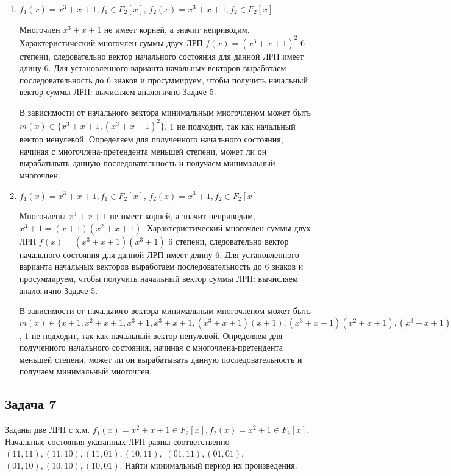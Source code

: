 \documentclass[12pt]{extarticle}
\begin{document}
\begin{enumerate}
     \item $f_1(x) = x^3+x+1, f_1\in F_2[x]$, $f_2(x) = x^3+x+1, f_2\in F_2[x]$
    
     Многочлен $x^3+x+1$ не имеет корней, а значит неприводим. Характеристический многочлен суммы двух ЛРП $f(x) = (x^3+x+1)^2$ 6 степени, следовательно вектор начального состояния для данной ЛРП имеет длину 6. Для установленного варианта начальных векторов выработаем последовательность до 6 знаков и просуммируем, чтобы получить начальный вектор суммы ЛРП: вычисляем аналогично Задаче 5.
     
     В зависимости от начального вектора минимальным многочленом может быть $m(x)\in\{x^3+x+1, (x^3+x+1)^2\}$, 1 не подходит, так как начальный вектор ненулевой. Определяем для полученного начального состояния, начиная с многочлена-претендента меньшей степени, может ли он вырабатывать данную последовательность и получаем минимальный многочлен.
     
     \item $f_1(x) = x^3+x+1, f_1\in F_2[x]$, $f_2(x) = x^3+1, f_2\in F_2[x]$
    
     Многочлены $x^3+x+1$  не имеет корней, а значит неприводим, $x^3+1 = (x+1)(x^2+x+1)$. Характеристический многочлен суммы двух ЛРП $f(x) = (x^3+x+1)(x^3+1)$ 6 степени, следовательно вектор начального состояния для данной ЛРП имеет длину 6. Для установленного варианта начальных векторов выработаем последовательность до 6 знаков и просуммируем, чтобы получить начальный вектор суммы ЛРП: вычисляем аналогично Задаче 5.
     
     В зависимости от начального вектора минимальным многочленом может быть $m(x)\in\{x+1, x^2+x+1, x^3+1, x^3+x+1, (x^3+x+1)(x+1), (x^3+x+1)(x^2+x+1), (x^3+x+1)(x^3+1)\}$, 1 не подходит, так как начальный вектор ненулевой. Определяем для полученного начального состояния, начиная с многочлена-претендента меньшей степени, может ли он вырабатывать данную последовательность и получаем минимальный многочлен.
\end{enumerate}

\subsection{Задача 7}
Заданы две ЛРП с х.м. $f_1(x)=x^2+x+1 \in F_2[x], f_2(x)=x^2+1\in F_2[x]$. Начальные состояния указанных ЛРП равны соответственно $ (11, 11), (11, 10), (11, 01), (10, 11),$ $ (01, 11), (01, 01), $ $(01, 10), (10, 10), (10, 01) $. Найти минимальный период их произведения.
\end{document}

